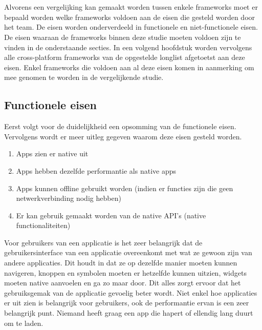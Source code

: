 \chapter{}
\label{ch:eisen-framework}

Alvorens een vergelijking kan gemaakt worden tussen enkele frameworks moet er bepaald worden welke frameworks voldoen aan de eisen die gesteld worden door het team. De eisen worden onderverdeeld in functionele en niet-functionele eisen. De eisen waaraan de frameworks binnen deze studie moeten voldoen zijn te vinden in de onderstaande secties. In een volgend hoofdstuk worden vervolgens alle cross-platform frameworks van de opgestelde longlist afgetoetst aan deze eisen. Enkel frameworks die voldoen aan al deze eisen komen in aanmerking om mee genomen te worden in de vergelijkende studie.

\section{Functionele eisen}
\label{sec:functioneleEisen}

Eerst volgt voor de duidelijkheid een opsomming van de functionele eisen. Vervolgens wordt er meer uitleg gegeven waarom deze eisen gesteld worden.

\begin{enumerate}
    \item Apps zien er native uit
    \item Apps hebben dezelfde performantie als native apps
    \item Apps kunnen offline gebruikt worden (indien er functies zijn die geen netwerkverbinding nodig hebben)
    \item Er kan gebruik gemaakt worden van de native API's (native functionaliteiten)
\end{enumerate}

Voor gebruikers van een applicatie is het zeer belangrijk dat de gebruikersinterface van een applicatie overeenkomt met wat ze gewoon zijn van andere applicaties. Dit houdt in dat ze op dezelfde manier moeten kunnen navigeren, knoppen en symbolen moeten er hetzelfde kunnen uitzien, widgets moeten native aanvoelen en ga zo maar door. Dit alles zorgt ervoor dat het gebruiksgemak van de applicatie gevoelig beter wordt. Niet enkel hoe applicaties er uit zien is belangrijk voor gebruikers, ook de performantie ervan is een zeer belangrijk punt. Niemand heeft graag een app die hapert of ellendig lang duurt om te laden. 

